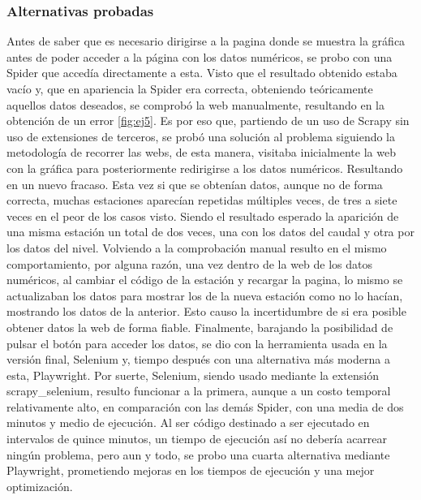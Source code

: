 \subsubsection{Alternativas probadas}
Antes de saber que es necesario dirigirse a la pagina donde se muestra la gráfica antes de poder acceder a la página con los datos numéricos, se probo con una Spider que accedía directamente a esta. Visto que el resultado obtenido estaba vacío y, que en apariencia la Spider era correcta, obteniendo teóricamente aquellos datos deseados, se comprobó la web manualmente, resultando en la obtención de un error \ref{fig:ej5}.\newline
\newline
Es por eso que, partiendo de un uso de Scrapy sin uso de extensiones de terceros, se probó una solución al problema siguiendo la metodología de recorrer las webs, de esta manera, visitaba inicialmente la web con la gráfica para posteriormente redirigirse a los datos numéricos. Resultando en un nuevo fracaso. Esta vez si que se obtenían datos, aunque no de forma correcta, muchas estaciones aparecían repetidas múltiples veces, de tres a siete veces en el peor de los casos visto. Siendo el resultado esperado la aparición de una misma estación un total de dos veces, una con los datos del caudal y otra por los datos del nivel. Volviendo a la comprobación manual resulto en el mismo comportamiento, por alguna razón, una vez dentro de la web de los datos numéricos, al cambiar el código de la estación y recargar la pagina, lo mismo se actualizaban los datos para mostrar los de la nueva estación como no lo hacían, mostrando los datos de la anterior.\newline
\newline
Esto causo la incertidumbre de si era posible obtener datos la web de forma fiable. Finalmente, barajando la posibilidad de pulsar el botón para acceder los datos, se dio con la herramienta usada en la versión final, Selenium y, tiempo después con una alternativa más moderna a esta, Playwright.\newline
\newline
Por suerte, Selenium, siendo usado mediante la extensión scrapy\_selenium, resulto funcionar a la primera, aunque a un costo temporal relativamente alto, en comparación con las demás Spider, con una media de dos minutos y medio de ejecución.\newline
\newline
Al ser código destinado a ser ejecutado en intervalos de quince minutos, un tiempo de ejecución así no debería acarrear ningún problema, pero aun y todo, se probo una cuarta alternativa mediante Playwright, prometiendo mejoras en los tiempos de ejecución y una mejor optimización.\newline
\newline

